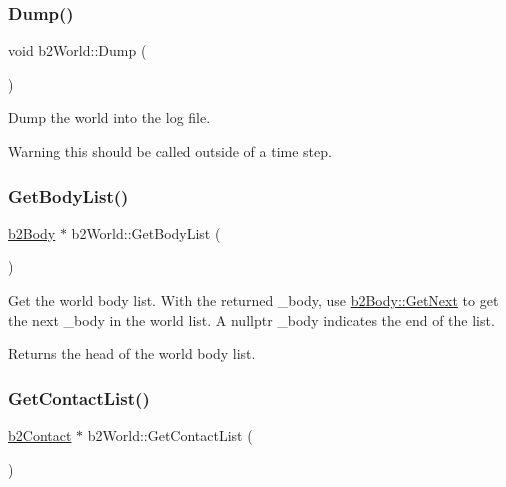 \subsubsection{\texorpdfstring{Dump()}{Dump()}}
{\footnotesize\ttfamily void b2\+World\+::\+Dump (\begin{DoxyParamCaption}{ }\end{DoxyParamCaption})}

Dump the world into the log file. \begin{DoxyWarning}{Warning}
this should be called outside of a time step. 
\end{DoxyWarning}
\mbox{\label{classb2World_a1b87c03955e3312d308ddf679adf3c85}} 
\subsubsection{\texorpdfstring{Get\+Body\+List()}{GetBodyList()}}
{\footnotesize\ttfamily \mbox{\hyperlink{classb2Body}{b2\+Body}} $\ast$ b2\+World\+::\+Get\+Body\+List (\begin{DoxyParamCaption}{ }\end{DoxyParamCaption})\hspace{0.3cm}{\ttfamily [inline]}}

Get the world body list. With the returned _body, use \mbox{\hyperlink{classb2Body_ad54182a11d02362b027a0eb072775bdc}{b2\+Body\+::\+Get\+Next}} to get the next _body in the world list. A nullptr _body indicates the end of the list. \begin{DoxyReturn}{Returns}
the head of the world body list. 
\end{DoxyReturn}
\mbox{\label{classb2World_ab1e1c59fd7534c0268c2a3e31370a425}} 
\subsubsection{\texorpdfstring{Get\+Contact\+List()}{GetContactList()}}
{\footnotesize\ttfamily \mbox{\hyperlink{classb2Contact}{b2\+Contact}} $\ast$ b2\+World\+::\+Get\+Contact\+List (\begin{DoxyParamCaption}{ }\end{DoxyParamCaption})\hspace{0.3cm}{\ttfamily [inline]}}

